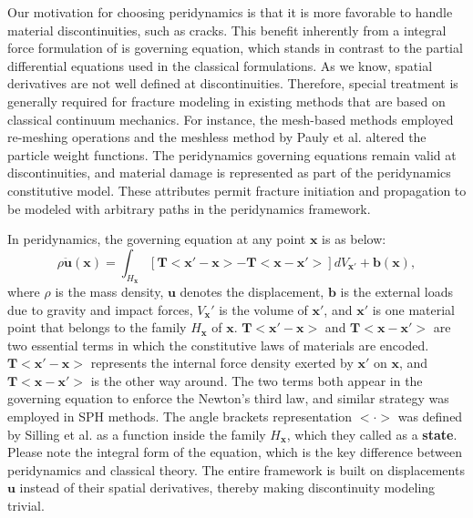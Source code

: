 Our motivation for choosing peridynamics is that it is more favorable to handle material discontinuities, such as cracks.
This benefit inherently from a integral force formulation of is governing equation, which stands in contrast to the partial differential equations used in the classical formulations.
As we know, spatial derivatives are not well defined at discontinuities. Therefore, special treatment is generally required for fracture modeling in existing methods that are based on classical continuum mechanics. For instance, the mesh-based methods \cite{O'Brien:1999:GMA:311535.311550,O'Brien:2002:GMA:566654.566579} employed re-meshing operations and the meshless method by Pauly et al. \cite{Pauly:2005:MAF:1073204.1073296} altered the particle weight functions. The peridynamics governing equations remain valid at discontinuities, and material damage is represented as part of the peridynamics constitutive model. These attributes permit fracture initiation and propagation to be modeled with arbitrary paths in the peridynamics framework.

In peridynamics, the governing equation at any point $\mathbf{x}$ is  as below:
\begin{equation}
\rho\ddot{\mathbf{u}}(\mathbf{x}) = \int_{H_\mathbf{x}}[\mathbf{T}<\mathbf{x}'-\mathbf{x}> - \mathbf{T}<\mathbf{x}-\mathbf{x}'>]dV_{\mathbf{x}'}+\mathbf{b}(\mathbf{x}),
\label{eq:1}
\end{equation}
where $\rho$ is the mass density, $\mathbf{u}$ denotes the displacement, $\mathbf{b}$ is the external loads due to gravity and impact forces, $V_\mathbf{x}'$ is the volume of $\mathbf{x}'$, and $\mathbf{x}'$ is one material point that belongs to the family $H_{\mathbf{x}}$ of $\mathbf{x}$. $\mathbf{T}<\mathbf{x}'-\mathbf{x}>$ and $\mathbf{T}<\mathbf{x}-\mathbf{x}'>$ are two essential terms in which the constitutive laws of materials are encoded. $\mathbf{T}<\mathbf{x}'-\mathbf{x}>$ represents the internal force density exerted by $\mathbf{x'}$ on $\mathbf{x}$, and $\mathbf{T}<\mathbf{x}-\mathbf{x}'>$ is the other way around. The two terms both appear in the governing equation to enforce the Newton's third law, and similar strategy was employed in SPH methods\cite{Muller:2003:PFS:846276.846298}. The angle brackets representation $<\cdot>$ was defined by Silling et al. \cite{silling2007peridynamic} as a function inside the family $H_\mathbf{x}$, which they called as a \textbf{state}. Please note the integral form of the equation, which is the key difference between peridynamics and classical theory. The entire framework is built on displacements $\mathbf{u}$ instead of their spatial derivatives, thereby making discontinuity modeling trivial.

